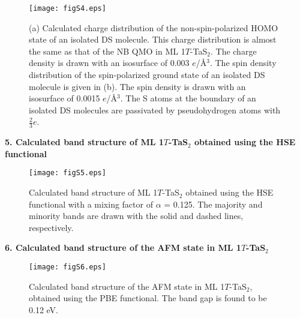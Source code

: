 \documentclass[aps,prl,twocolumn,showpacs,byrevtex]{revtex4}
\begin{document}
\begin{figure}[h]
\texttt{[image: figS4.eps]}
\caption{(a) Calculated charge distribution of the non-spin-polarized HOMO state of an isolated DS molecule. This charge distribution is almost the same as that of the NB QMO in ML 1$T$-TaS$_2$. The charge density is drawn with an isosurface of 0.003 $e$/{\AA}$^3$. The spin density distribution of the spin-polarized ground state of an isolated DS molecule is given in (b). The spin density is drawn with an isosurface of 0.0015 $e$/{\AA}$^3$. The S atoms at the boundary of an isolated DS molecules are passivated by pseudohydrogen atoms with $\frac{2}{3}$$e$. }
\label{fig:S4}
\end{figure}

\newpage

\vspace{1.4cm}
{\bf \large 5. Calculated band structure of ML 1$T$-TaS$_2$ obtained using the HSE functional}

\begin{figure}[h]
\texttt{[image: figS5.eps]}
\caption{Calculated band structure of ML 1$T$-TaS$_2$ obtained using the HSE functional with a mixing factor of ${\alpha}$ = 0.125. The majority and minority bands are drawn with the solid and dashed lines, respectively. }
\label{fig:S5}
\end{figure}


\vspace{1.4cm}
{\bf \large 6. Calculated band structure of the AFM state in ML 1$T$-TaS$_2$}

\begin{figure}[h]
\texttt{[image: figS6.eps]}
\caption{Calculated band structure of the AFM state in ML 1$T$-TaS$_2$, obtained using the PBE functional. The band gap is found to be 0.12 eV.}
\label{fig:S4}
\end{figure}
\end{document}
